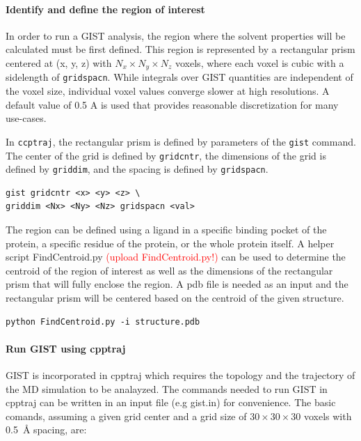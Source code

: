 \documentclass[9pt,tutorial]{livecoms}
\newcommand{\software}{\texttt}
\newcommand{\todo}{\textcolor{red}}
\newcommand\inlinecode{\texttt}
\begin{document}
\paragraph{Identify and define the region of interest}
In order to run a GIST analysis, the region where the solvent properties will be calculated must be first defined. This region is represented by a rectangular prism centered at (x, y, z) with $N_x \times N_y \times N_z$ voxels, where each voxel is cubic with a sidelength of \inlinecode{gridspacn}.
While integrals over GIST quantities are independent of the voxel size, individual voxel values converge slower at high resolutions.
A default value of 0.5 A is used that provides reasonable discretization for many use-cases.

In \software{ccptraj}, the rectangular prism is defined by parameters of the \inlinecode{gist} command.
The center of the grid is defined by \inlinecode{gridcntr}, the dimensions of the grid is defined by \inlinecode{griddim}, and the spacing is defined by \inlinecode{gridspacn}.

\begin{lstlisting}
gist gridcntr <x> <y> <z> \
griddim <Nx> <Ny> <Nz> gridspacn <val>
\end{lstlisting}


The region can be defined using a ligand in a specific binding pocket of the protein, a specific residue of the protein, or the whole protein itself. A helper script FindCentroid.py \todo{(upload FindCentroid.py!)} can be used to determine the centroid of the region of interest as well as the dimensions of the rectangular prism that will fully enclose the region. A pdb file is needed as an input and the rectangular prism will be centered based on the centroid of the given structure.

\begin{lstlisting}
python FindCentroid.py -i structure.pdb
\end{lstlisting}

\paragraph{Run GIST using cpptraj}
GIST is incorporated in cpptraj which requires the topology and the trajectory of the MD simulation to be analayzed. The commands needed to run GIST in cpptraj can be written in an input file (e.g gist.in) for convenience. The basic comands, assuming a given grid center and a grid size of $30\times30\times30$ voxels with \SI{0.5}{\angstrom} spacing, are:
\end{document}
